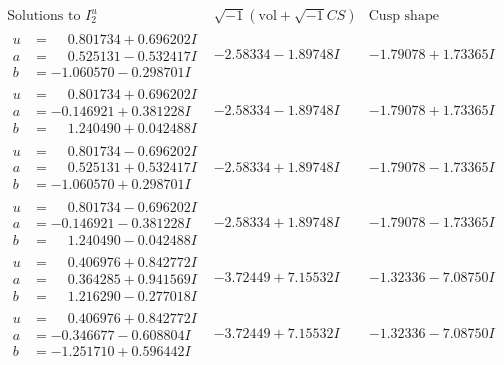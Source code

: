 \documentclass[1p]{elsarticle_modified}
\theoremstyle{definition}
\newcommand{\I}{\sqrt{-1}}
\begin{document}
$$\begin{array}{c|c|c}  
\text{Solutions to }I^u_{2}& \I (\text{vol} + \sqrt{-1}CS) & \text{Cusp shape}\\
 \hline 
\begin{aligned}
u &= \phantom{-}0.801734 + 0.696202 I \\
a &= \phantom{-}0.525131 - 0.532417 I \\
b &= -1.060570 - 0.298701 I\end{aligned}
 & -2.58334 - 1.89748 I & -1.79078 + 1.73365 I \\ \hline\begin{aligned}
u &= \phantom{-}0.801734 + 0.696202 I \\
a &= -0.146921 + 0.381228 I \\
b &= \phantom{-}1.240490 + 0.042488 I\end{aligned}
 & -2.58334 - 1.89748 I & -1.79078 + 1.73365 I \\ \hline\begin{aligned}
u &= \phantom{-}0.801734 - 0.696202 I \\
a &= \phantom{-}0.525131 + 0.532417 I \\
b &= -1.060570 + 0.298701 I\end{aligned}
 & -2.58334 + 1.89748 I & -1.79078 - 1.73365 I \\ \hline\begin{aligned}
u &= \phantom{-}0.801734 - 0.696202 I \\
a &= -0.146921 - 0.381228 I \\
b &= \phantom{-}1.240490 - 0.042488 I\end{aligned}
 & -2.58334 + 1.89748 I & -1.79078 - 1.73365 I \\ \hline\begin{aligned}
u &= \phantom{-}0.406976 + 0.842772 I \\
a &= \phantom{-}0.364285 + 0.941569 I \\
b &= \phantom{-}1.216290 - 0.277018 I\end{aligned}
 & -3.72449 + 7.15532 I & -1.32336 - 7.08750 I \\ \hline\begin{aligned}
u &= \phantom{-}0.406976 + 0.842772 I \\
a &= -0.346677 - 0.608804 I \\
b &= -1.251710 + 0.596442 I\end{aligned}
 & -3.72449 + 7.15532 I & -1.32336 - 7.08750 I \\ \hline\begin{aligned}

\end{aligned}
\end{array}$$
\end{document}

